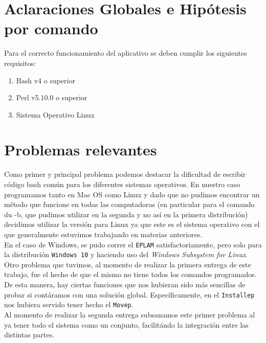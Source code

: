 \documentclass[10pt,a4paper]{article}
\begin{document}
\pagebreak

\tableofcontents

\pagebreak

\section{Aclaraciones Globales e Hipótesis por comando}
Para el correcto funcionamiento del aplicativo se deben cumplir los siguientes requisitos:

\begin{enumerate}
    \item Bash v4 o superior
    \item Perl v5.10.0 o superior
    \item Sistema Operativo Linux
\end{enumerate}

\section{Problemas relevantes}
Como primer y principal problema podemos destacar la dificultad de escribir código bash común para los diferentes sistemas operativos. En nuestro caso programamos tanto en Mac OS como Linux y dado que no pudimos encontrar un método que funcione en todas las computadoras (en particular para el comando du -b, que pudimos utilizar en la segunda y no así en la primera distribución) decidimos utilizar la versión para Linux ya que este es el sistema operativo con el que generalmente estuvimos trabajando en materias anteriores.\\
En el caso de Windows, se pudo correr el \texttt{EPLAM} satisfactoriamente, pero solo para la distribución \texttt{Windows 10} y haciendo uso del \textit{Windows Subsystem for Linux}.\\ 
Otro problema que tuvimos, al momento de realizar la primera entrega de este trabajo, fue el hecho de que el mismo no tiene todos los comandos programados. De esta manera, hay ciertas funciones que nos hubieran sido más sencillas de probar si contáramos con una solución global. Específicamente, en el \texttt{Installep} nos hubiera servido tener hecho el \texttt{Movep}.\\
Al momento de realizar la segunda entrega subsanamos este primer problema al ya tener todo el sistema como un conjunto, facilitándo la integración entre las distintas partes.
\end{document}
